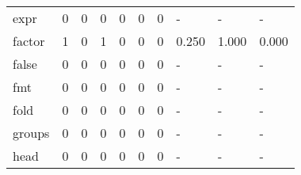 \begin{longtable}{lp{2.0cm}p{2.0cm}p{2.0cm}p{2.0cm}p{2.0cm}p{2.0cm}p{2.0cm}p{2.0cm}p{2.0cm}}
expr      &                      0 &                                             0 &                                            0 &                                           0 &                                            0 &                                          0 &                                    - &                                      - &                                    - \\
factor    &                      1 &                                             0 &                                            1 &                                           0 &                                            0 &                                          0 &                                0.250 &                                  1.000 &                                0.000 \\
false     &                      0 &                                             0 &                                            0 &                                           0 &                                            0 &                                          0 &                                    - &                                      - &                                    - \\
fmt       &                      0 &                                             0 &                                            0 &                                           0 &                                            0 &                                          0 &                                    - &                                      - &                                    - \\
fold      &                      0 &                                             0 &                                            0 &                                           0 &                                            0 &                                          0 &                                    - &                                      - &                                    - \\
groups    &                      0 &                                             0 &                                            0 &                                           0 &                                            0 &                                          0 &                                    - &                                      - &                                    - \\
head      &                      0 &                                             0 &                                            0 &                                           0 &                                            0 &                                          0 &                                    - &                                      - &                                    - \\

\end{longtable}
